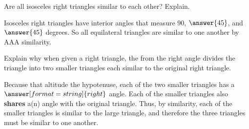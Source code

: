 \documentclass[nooutcomes]{ximera}
\begin{document}
\begin{question}Are all isosceles right triangles similar to each other? 
 Explain.  
\begin{question}
Isosceles right triangles have interior angles that measure $90$, $\answer{45}$, and $\answer{45}$ degrees.  So all equilateral triangles are similar to one another by AAA similarity.  
\end{question}
\end{question}

\begin{question}
Explain why when given a right triangle, the 
from the right angle divides the triangle into two smaller triangles each
  similar to the original right triangle.
\begin{question}
Because that altitude  the hypotenuse, each of the two smaller triangles has a 
$\answer[format=string]{right}$ angle. Each of the smaller triangles also \textbf{shares} a(n) 
angle with the original triangle.  Thus, by 
similarity, each of the smaller triangles is similar to the large triangle, and therefore the three triangles must be similar to one another.  
\end{question}
\end{question}

\end{document}

